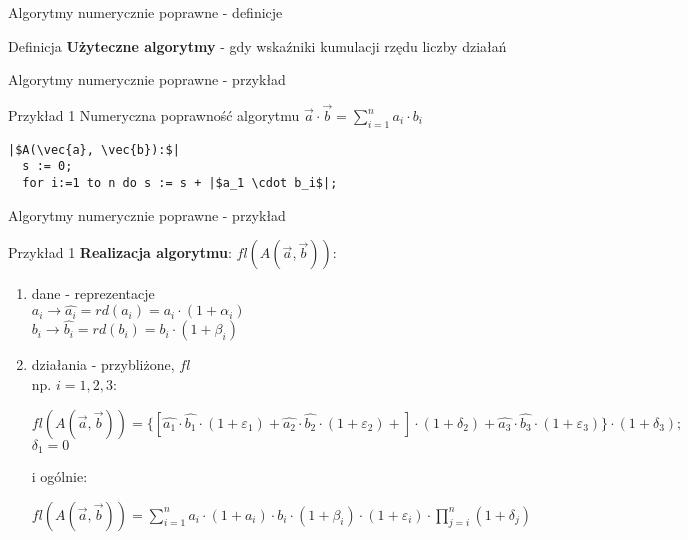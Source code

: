 \begin{frame}{Algorytmy numerycznie poprawne - definicje}
	\begin{block}{Definicja}
		{\bf Użyteczne algorytmy} - gdy wskaźniki kumulacji rzędu liczby działań
	\end{block}
\end{frame}
\begin{frame}[fragile]{Algorytmy numerycznie poprawne - przykład}
	\begin{exampleblock}{Przykład 1}
		Numeryczna poprawność algorytmu $\vec{a} \cdot \vec{b} = \sum_{i=1}^{n} a_i \cdot b_i$
        
\begin{lstlisting}[escapechar=|]
  |$A(\vec{a}, \vec{b}):$|
  s := 0;
  for i:=1 to n do s := s + |$a_1 \cdot b_i$|;
\end{lstlisting}
	\end{exampleblock}
\end{frame}
\begin{frame}{Algorytmy numerycznie poprawne - przykład}
	\begin{exampleblock}{Przykład 1}
		{\bf Realizacja algorytmu}: $fl(A(\vec{a}, \vec{b}))$:
        \begin{enumerate}
        	\item dane - reprezentacje \\
                \hspace{1cm} $a_i \to \hat{a_i} = rd(a_i) = a_i \cdot (1 + \alpha_i)$ \\
                \hspace{1cm} $b_i \to \hat{b_i} = rd(b_i) = b_i \cdot (1 + \beta_i)$
        	\item działania - przybliżone, $fl$ \\
            	np. $i = 1, 2, 3:$ \\ 
                \begin{addmargin}[1em]{0em}
                $
                    fl(A(\vec{a}, \vec{b})) = \{
                        [
                            \hat{a_1} \cdot \hat{b_1} \cdot (1 + \varepsilon_1) +
                            \hat{a_2} \cdot \hat{b_2} \cdot (1 + \varepsilon_2) +
                        ]
                        \cdot (1 + \delta_2) + \hat{a_3} \cdot \hat{b_3} \cdot (1 + \varepsilon_3)
                    \} \cdot (1 + \delta_3); 
                $ \\
                $\delta_1 = 0$ \\
                
                \end{addmargin}
            	i ogólnie:
                \begin{addmargin}[1em]{0em}
                $
                	fl(A(\vec{a}, \vec{b})) =
                	\sum_{i=1}^{n} a_i \cdot (1+a_i) \cdot 
                    b_i \cdot (1 + \beta_i) \cdot (1 + \varepsilon_i)
                    \cdot \prod_{j=i}^{n} (1 + \delta_j)
                $                
                \end{addmargin}
        \end{enumerate}
	\end{exampleblock}
\end{frame}
